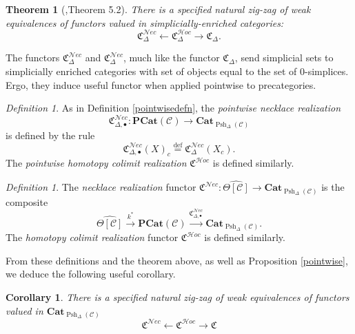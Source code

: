 \documentclass{amsart}
\numberwithin{equation}{section}
\theoremstyle{plain}   %
\newtheorem{thm}[subsection]{Theorem}
\newtheorem{cor}[subsection]{Corollary}
\theoremstyle{remark}
\newtheorem{defn}[subsection]{Definition}
\theoremstyle{plain}
\newcommand{\Nec}{\ensuremath{{\mathcal{N}ec}}}
\newcommand{\Hoc}{\ensuremath{{\mathcal{H}oc}}}
\newcommand{\Cat}{\ensuremath{\mathbf{Cat}}}
\newcommand{\C}{\ensuremath{\mathcal{C}}}
\newcommand{\defeq}{\overset{\mathrm{def}}=}
\newcommand{\cellset}{\ensuremath{\widehat{\Theta[\mathcal{C}]}}}
\newcommand{\spsh}{\ensuremath{\operatorname{Psh}_\Delta(\mathcal{C})}}
\begin{document}
\begin{thm}[\cite{ds1},Theorem 5.2]
	There is a specified natural zig-zag of weak equivalences of functors valued in simplicially-enriched categories:
	\[
		\mathfrak{C}^{\Nec}_\Delta \leftarrow \mathfrak{C}^{\Hoc}_\Delta \to \mathfrak{C}_\Delta.
	\]
\end{thm}

The functors \(\mathfrak{C}_\Delta^{\Nec}\) and \(\mathfrak{C}_\Delta^{\Nec}\), much like the functor \(\mathfrak{C}_\Delta\), send simplicial sets to simplicially enriched categories with set of objects equal to the set of \(0\)-simplices.  Ergo, they induce useful functor when applied pointwise to precategories.
\begin{defn}
	As in Definition \ref{pointwisedefn},  the \emph{pointwise necklace realization}
	\[
		\mathfrak{C}^{\Nec}_{\Delta,\bullet}:\mathbf{PCat}(\C) \to \Cat_{\spsh}
	\] 
	is defined by the rule
	\[
		\mathfrak{C}^{\Nec}_{\Delta,\bullet}(X)_c\defeq \mathfrak{C}^{\Nec}_{\Delta}(X_c).
	\]
	The \emph{pointwise homotopy colimit realization} \(\mathfrak{C}^{\Hoc}\) is defined similarly.  
\end{defn}

\begin{defn}
	The \emph{necklace realization} functor \(\mathfrak{C}^{\Nec}:\cellset \to \Cat_{\spsh}\) is the composite
	\[
		\cellset \xrightarrow{k^\ast} \mathbf{PCat}(\C) \xrightarrow{\mathfrak{C}^{\Nec}_{\Delta,\bullet}} \Cat_{\spsh}.
	\]
	The \emph{homotopy colimit realization} functor \(\mathfrak{C}^{\Hoc}\) is defined similarly.
\end{defn}

From these definitions and the theorem above, as well as Proposition \ref{pointwise}, we deduce the following useful corollary.

\begin{cor}\label{necthm}
	There is a specified natural zig-zag of weak equivalences of functors valued in \(\Cat_{\spsh}\)
	\[
		\mathfrak{C}^{\Nec} \leftarrow \mathfrak{C}^{\Hoc} \to \mathfrak{C}
	\]
\end{cor}
\end{document}
